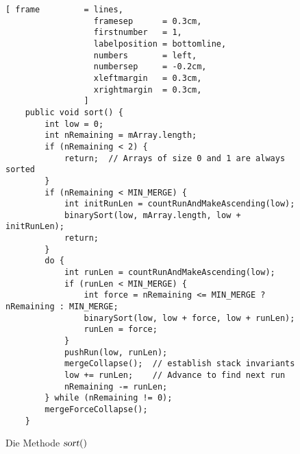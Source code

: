 \begin{figure}[!ht]
\centering
\begin{Verbatim}[ frame         = lines, 
                  framesep      = 0.3cm, 
                  firstnumber   = 1,
                  labelposition = bottomline,
                  numbers       = left,
                  numbersep     = -0.2cm,
                  xleftmargin   = 0.3cm,
                  xrightmargin  = 0.3cm,
                ]
    public void sort() {
        int low = 0;
        int nRemaining = mArray.length;
        if (nRemaining < 2) {
            return;  // Arrays of size 0 and 1 are always sorted
        }
        if (nRemaining < MIN_MERGE) {
            int initRunLen = countRunAndMakeAscending(low);
            binarySort(low, mArray.length, low + initRunLen);
            return;
        }
        do {
            int runLen = countRunAndMakeAscending(low);
            if (runLen < MIN_MERGE) {
                int force = nRemaining <= MIN_MERGE ? nRemaining : MIN_MERGE;
                binarySort(low, low + force, low + runLen);
                runLen = force;
            }
            pushRun(low, runLen);
            mergeCollapse();  // establish stack invariants
            low += runLen;    // Advance to find next run
            nRemaining -= runLen;
        } while (nRemaining != 0);
        mergeForceCollapse();
    }
\end{Verbatim}
\vspace*{-0.3cm}
\caption{Die Methode $\textsl{sort}()$}
\label{fig:TimSort.java:sort}
\end{figure}

